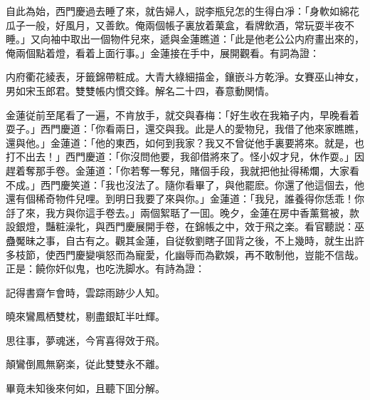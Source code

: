 自此為始，西門慶過去睡了來，就告婦人，説李瓶兒怎的生得白凈：「身軟如綿花瓜子一般，好風月，又善飲。俺兩個帳子裏放着菓盒，看牌飲酒，常玩耍半夜不睡。」又向袖中取出一個物件兒來，遞與金蓮瞧道：「此是他老公公内府畫出來的，俺兩個點着燈，看着上面行事。」金蓮接在手中，展開觀看。有詞為證：

\begin{myquote}
内府衢花綾表，牙籤錦帶粧成。大青大綠細描金，鑲嵌斗方乾淨。女賽巫山神女，男如宋玉郎君。雙雙帳内慣交鋒。解名二十四，春意動関情。
\end{myquote}

金蓮従前至尾看了一遍，不肯放手，就交與春梅：「好生收在我箱子内，早晚看着耍子。」西門慶道：「你看兩日，還交與我。此是人的愛物兒，我借了他來家瞧瞧，還與他。」金蓮道：「他的東西，如何到我家？我又不曾従他手裏要將來。就是，也打不出去！」西門慶道：「你沒問他要，我卻借將來了。怪小奴才兒，休作耍。」因趕着奪那手卷。金蓮道：「你若奪一奪兒，賭個手段，我就把他扯得稀爛，大家看不成。」西門慶笑道：「我也沒法了。隨你看畢了，與他罷麽。你還了他這個去，他還有個稀奇物件兒哩。到明日我要了來與你。」金蓮道：「我兒，誰養得你恁乖！你㧱了來，我方與你這手卷去。」兩個絮聒了一囬。晚夕，金蓮在房中香薰鴛被，款設銀燈，豔粧澡牝，與西門慶展開手卷，在錦帳之中，效于飛之楽。看官聽説：巫蠱魘昧之事，自古有之。觀其金蓮，自従敎劉瞎子囬背之後，不上幾時，就生出許多枝節，使西門慶變嗔怒而為寵愛，化幽辱而為歡娛，再不敢制他，豈能不信哉。正是：饒你奸似鬼，也吃洗脚水。有詩為證：

\begin{myquote}
記得書齋乍會時，雲踪雨跡少人知。

曉來鸞鳳栖雙枕，剔盡銀缸半吐輝。

思往事，夢魂迷，今宵喜得效于飛。

顛鸞倒鳳無窮楽，従此雙雙永不離。
\end{myquote}

畢竟未知後來何如，且聽下囬分解。

